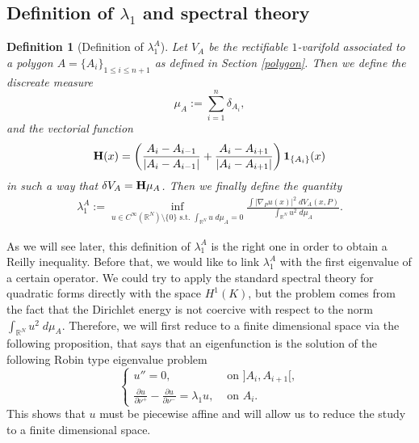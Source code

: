 \documentclass[12pt,english]{smfart} %
\newtheorem{definition}[theorem]{Definition}
\theoremstyle{remark}
\newcommand{\R}{\mathbb{R}}
\begin{document}
 \subsection{Definition of $\lambda_1$ and spectral theory}
 
 
 
 \medskip\begin{definition}[Definition of $\lambda_1^A$] \label{deflambda1} Let  $V_A$ be the rectifiable $1$-varifold associated to a polygon $A=\{A_i\}_{1\leqslant i \leqslant n+1}$ as defined in Section \ref{polygon}. Then we define the discreate measure 
 $$\mu_A:=\sum_{i=1}^n\delta_{A_i},$$
 and the vectorial function $${\bf H}(x)= \left(\frac{A_{i}-A_{i-1}}{|A_i-A_{i-1}|}+ \frac{A_{i}-A_{i+1}}{|A_i-A_{i+1}|}\right) {\bf 1}_{\{A_i\}}(x)$$
 in such a way that $\delta V_A= {\bf H}\mu_A$.
 Then we finally define the  quantity
 \begin{eqnarray}
 \lambda_1^A:=\inf_{u \in C^\infty(\mathbb{R}^N) \setminus \{0\} \text{ s.t. } \int_{\R^N} u \; d \mu_A=0} \frac{\int |\nabla_P u(x)|^2 \;d V_A(x,P)}{\int_{\mathbb{R}^N} u^2\;d\mu_A}. \label{lambdaP}
 \end{eqnarray}
 \end{definition}
 
 As we will see later, this definition of $\lambda_1^A$ is the right one in order to obtain a Reilly inequality. Before that, we would like to link $\lambda_1^A$ with the first eigenvalue of a certain operator.  We could try to apply the standard spectral theory for quadratic forms directly with the space $H^1(K)$, but  the problem comes from the fact that the Dirichlet energy is not coercive with respect to the norm $\int_{\mathbb{R}^N} u^2\;d\mu_A$.  Therefore, we will first reduce to a finite dimensional space via the following proposition, that says that an eigenfunction is the solution of the following Robin type eigenvalue problem
 $$
 \left\{
 \begin{array}{ll}
  u'' = 0,& \text{ on } ]A_i , A_{i+1}[,\\
\displaystyle \frac{\partial u}{\partial \nu^+}  -  \frac{\partial u}{\partial \nu^-} =\lambda_1 u, & \text{ on } A_i.
 \end{array}
\right.
 $$
This shows that $u$ must be piecewise affine and will allow us to reduce the study to a finite dimensional space.
 
\end{document}
